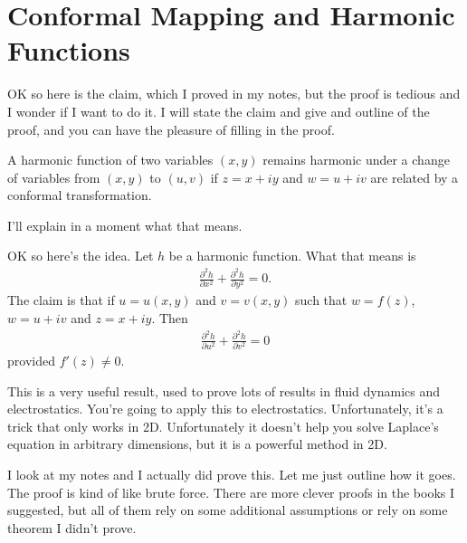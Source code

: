 \section{Conformal Mapping and Harmonic Functions}
OK so here is the claim,
which I proved in my notes,
but the proof is tedious and I wonder if I want to do it.
I will state the claim and give and outline of the proof,
and you can have the pleasure of filling in the proof.

\begin{theorem}
    A harmonic function of two variables $(x, y)$
    remains harmonic under a change of variables from $(x, y)$
    to $(u, v)$ if $z = x + iy$ and $w= u + iv$
    are related by a conformal transformation.
\end{theorem}
I'll explain in a moment what that means.

OK so here's the idea.
Let $h$ be a harmonic function.
What that means is
\begin{align}
    \frac{\partial^2 h}{\partial x^2}
    + \frac{\partial^2 h}{\partial y^2} = 0.
\end{align}
The claim is that if $u=u(x, y)$ and $v=v(x, y)$
such that $w = f(z)$,
$w=u+iv$ and $z=x+iy$.
Then
\begin{align}
    \frac{\partial^2 h}{\partial u^2}
    + \frac{\partial^2 h}{\partial v^2} =0
\end{align}
provided $f'(z)\ne 0$.

This is a very useful result,
used to prove lots of results in fluid dynamics and electrostatics.
You're going to apply this to electrostatics.
Unfortunately,
it's a trick that only works in 2D.
Unfortunately it doesn't help you solve Laplace's equation in arbitrary
dimensions,
but it is a powerful method in 2D.

I look at my notes and I actually did prove this.
Let me just outline how it goes.
The proof is kind of like brute force.
There are more clever proofs in the books I suggested,
but all of them rely on some additional assumptions or rely on some theorem I
didn't prove.

